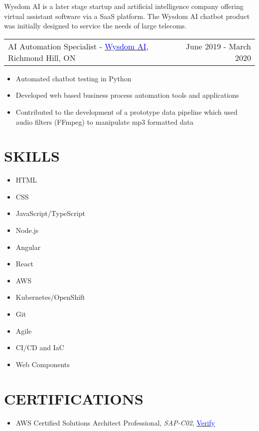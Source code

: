 \documentclass[margin]{res}
\begin{document}
\begin{resume}
	Wysdom AI is a later stage startup and artificial intelligence company offering virtual assistant software
	via a SaaS platform. The Wysdom AI chatbot product was initially designed to service the needs of
	large telecoms.

	\begin{tabular}{p{3in} r} %
		AI Automation Specialist - \href{https://wysdom.ai}{\textcolor{blue}{Wysdom AI}}, Richmond Hill, ON & June 2019 - March 2020
	\end{tabular}
	\begin{itemize} %
		\item Automated chatbot testing in Python
		\item Developed web based business process automation tools and applications
		\item Contributed to the development of a prototype data pipeline which used audio filters
		      (FFmpeg) to manipulate mp3 formatted data

	\end{itemize}
	\section{\textcolor{NavyBlue}{SKILLS}}
	\begin{multicols}{3}
		\begin{itemize}
			\item HTML
			\item CSS
			\item JavaScript/TypeScript
			\item Node.js
			\item Angular
			\item React
			\item AWS
			\item Kubernetes/OpenShift
			\item Git
			\item Agile
			\item CI/CD and IaC
			\item Web Components
		\end{itemize}
	\end{multicols}

	\section{\textcolor{NavyBlue}{CERTIFICATIONS}}
	\begin{itemize} %
		\item AWS Certified Solutions Architect Professional, \textit{SAP-C02},
		      \href{https://www.youracclaim.com/badges/6768bef0-a7c0-42a6-9b36-6e13351250be}{\textcolor{blue}{Verify}}


\end{itemize}
\end{resume}
\end{document}
